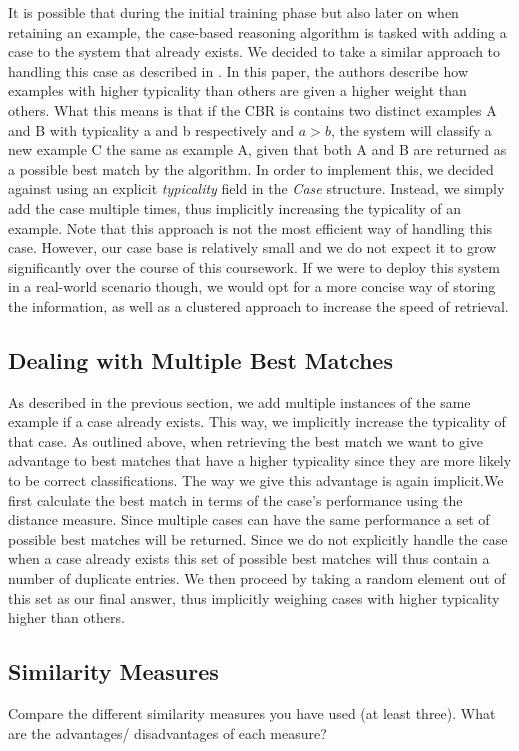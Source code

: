 \documentclass[10pt,a4paper]{article}
\begin{document}
It is possible that during the initial training phase but also later on when retaining an example, the case-based reasoning algorithm is tasked with adding a case to the system that already exists. We decided to take a similar approach to handling this case as described in \cite{Pantic2004}. In this paper, the authors describe how examples with higher typicality than others are given a higher weight than others. What this means is that if the CBR is contains two distinct examples A and B with typicality a and b respectively and $a > b$, the system will classify a new example C the same as example A, given that both A and B are returned as a possible best match by the algorithm. 
In order to implement this, we decided against using an explicit \emph{typicality} field in the \emph{Case} structure. Instead, we simply add the case multiple times, thus implicitly increasing the typicality of an example. Note that this approach is not the most efficient way of handling this case. However, our case base is relatively small and we do not expect it to grow significantly over the course of this coursework. If we were to deploy this system in a real-world scenario though, we would opt for a more concise way of storing the information, as well as a clustered approach to increase the speed of retrieval.

\subsection{Dealing with Multiple Best Matches}
As described in the previous section, we add multiple instances of the same example if a case already exists. This way, we implicitly increase the typicality of that case. As outlined above, when retrieving the best match we want to give advantage to best matches that have a higher typicality since they are more likely to be correct classifications. The way we give this advantage is again implicit.We first calculate the best match in terms of the case's performance using the distance measure. Since multiple cases can have the same performance a set of possible best matches will be returned. Since we do not explicitly handle the case when a case already exists this set of possible best matches will thus contain a number of duplicate entries. We then proceed by taking a random element out of this set as our final answer, thus implicitly weighing cases with higher typicality higher than others.

\subsection{Similarity Measures}
Compare the different similarity measures you have used (at least three). What are the advantages/ disadvantages of each measure?
\end{document}
